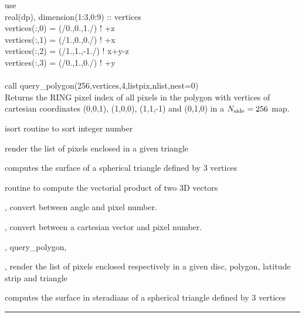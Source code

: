 \begin{example}
{
use  \\
real(dp), dimension(1:3,0:9) :: vertices \\
vertices(:,0) = (/0.,0.,1./)  ! +z \\
vertices(:,1) = (/1.,0.,0./)  ! +x \\
vertices(:,2) = (/1.,1.,-1./) ! x+y-z \\
vertices(:,3) = (/0.,1.,0./)  ! +y \\
 \\
call query\_polygon(256,vertices,4,listpix,nlist,nest=0)  \\
}
{
Returns the RING pixel index of all pixels in the polygon with vertices of
cartesian coordinates (0,0,1), (1,0,0), (1,1,-1) and (0,1,0) in a ${N_{\rm side}}=256$ map.
}
\end{example}
\begin{modules}
  \begin{sulist}{} %
 \item[isort] routine to sort integer number
 \item[\htmlref{query\_triangle}{sub:query_triangle}] render the list of pixels enclosed
  in a given triangle
 \item[\htmlref{surface\_triangle}{sub:surface_triangle}] computes the surface of a spherical triangle defined by 3 vertices
 \item[\htmlref{vect\_prod}{sub:vect_prod}] routine to compute the vectorial product of two 3D vectors
  \end{sulist}
\end{modules}

\begin{related}
  \begin{sulist}{} %
  \item[\htmlref{pix2ang}{sub:pix_tools}, \htmlref{ang2pix}{sub:pix_tools}] convert between angle and pixel number.
  \item[\htmlref{pix2vec}{sub:pix_tools}, \htmlref{vec2pix}{sub:pix_tools}] convert between a cartesian vector and pixel number.
  \item[\htmlref{query\_disc}{sub:query_disc}, query\_polygon,]
  \item[\htmlref{query\_strip}{sub:query_strip}, \htmlref{query\_triangle}{sub:query_triangle}] render the list of pixels enclosed
  respectively in a given disc, polygon, latitude strip and triangle
  \item[\htmlref{surface\_triangle}{sub:surface_triangle}] computes the surface
in steradians of a spherical triangle defined by 3 vertices

  \end{sulist}
\end{related}

\rule{\hsize}{2mm}

\newpage
